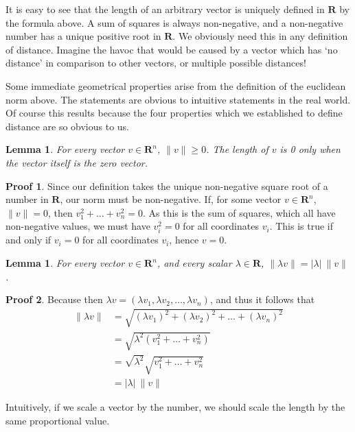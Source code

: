 \documentclass[12pt]{amsbook}
\theoremstyle{plain}
\newtheorem{lemma}[theorem]{Lemma}
\theoremstyle{definition}
\newtheorem*{prf}{Proof}
\begin{document}
It is easy to see that the length of an arbitrary vector is uniquely defined in $\mathbf{R}$ by the formula above. A sum of squares is always non-negative, and a non-negative number has a unique positive root in $\mathbf{R}$. We obviously need this in any definition of distance. Imagine the havoc that would be caused by a vector which has `no distance' in comparison to other vectors, or multiple possible distances!

Some immediate geometrical properties arise from the definition of the euclidean norm above. The statements are obvious to intuitive statements in the real world. Of course this results because the four properties which we established to define distance are so obvious to us.

\begin{lemma}
  For every vector $v \in \mathbf{R}^n$, $\|v\| \geq 0$. The length of $v$ is 0 only when the vector itself is the zero vector.
\end{lemma}
\begin{prf}
  Since our definition takes the unique non-negative square root of a number in $\mathbf{R}$, our norm must be non-negative. If, for some vector $v \in \mathbf{R}^n$, $\| v \| = 0$, then $v_1^2 + \dots + v_n^2 = 0$. As this is the sum of squares, which all have non-negative values, we must have $v_i^2 = 0$ for all coordinates $v_i$. This is true if and only if $v_i = 0$ for all coordinates $v_i$, hence $v = 0$.
\end{prf}

\begin{lemma}
  For every vector $v \in \mathbf{R}^n$, and every scalar $\lambda \in \mathbf{R}$, $\| \lambda v \| = | \lambda |\ \| v \|$.
\end{lemma}
\begin{prf}
  Because then $\lambda v = (\lambda v_1, \lambda v_2, \dots, \lambda v_n)$, and thus it follows that
  \begin{align*}
    \| \lambda v \| &= \sqrt{(\lambda v_1)^2 + (\lambda v_2)^2 + \dots + (\lambda v_n)^2}\\
                    &= \sqrt{\lambda^2(v_1^2 + \dots + v_n^2)}\\
                    &= \sqrt{\lambda^2} \sqrt{v_1^2 + \dots + v_n^2}\\
                    &= | \lambda |\ \| v \|
  \end{align*}
\end{prf}

Intuitively, if we scale a vector by the number, we should scale the length by the same proportional value.
\end{document}

